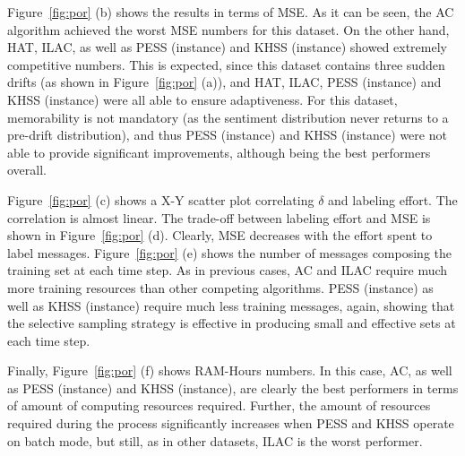 Figure~\ref{fig:por} (b) shows the results in terms of MSE.%
As it can be seen, the AC algorithm achieved the worst MSE numbers for this dataset. On the other hand, HAT, ILAC, as well as PESS (instance) and KHSS (instance) showed extremely competitive numbers. This is expected, since this dataset contains three sudden drifts (as shown in Figure~\ref{fig:por} (a)), and HAT, ILAC, PESS (instance) and KHSS (instance) were all able to ensure adaptiveness.
For this dataset, memorability is not mandatory (as the sentiment distribution never returns to a pre-drift
distribution), and thus PESS (instance) and KHSS (instance) were not able to provide significant improvements, although being the best performers overall.

Figure~\ref{fig:por} (c) shows a X-Y scatter plot correlating $\delta$ and labeling effort. The correlation is almost linear. The trade-off between labeling effort and MSE is shown in Figure~\ref{fig:por} (d). Clearly, MSE decreases with the effort spent to label messages.
Figure~\ref{fig:por} (e) shows the number of messages composing the training set at each time step.
As in previous cases, AC and ILAC require much more training resources than other competing algorithms. PESS (instance) as well as KHSS (instance) require much less training messages, again, showing that the selective sampling strategy is effective in producing small and effective sets at each time step.

Finally, Figure~\ref{fig:por} (f)
shows RAM-Hours numbers. In this case, AC, as well as PESS (instance) and KHSS (instance), are clearly the best performers in terms of amount of computing resources required. Further, the amount of resources required during the process significantly increases when PESS and KHSS operate on batch mode, but still, as in other datasets, ILAC is the worst performer.

